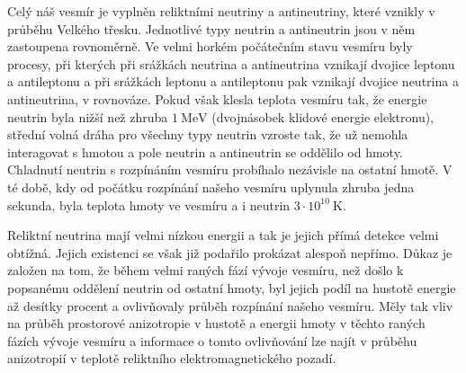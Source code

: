 \documentclass[../../main.tex]{subfiles}
\begin{document}
Celý náš vesmír je vyplněn reliktními neutriny a antineutriny, které vznikly v průběhu Velkého třesku. Jednotlivé typy neutrin a antineutrin jsou v něm zastoupena rovnoměrně. Ve velmi horkém počátečním stavu vesmíru byly procesy, při kterých při srážkách neutrina a antineutrina vznikají dvojice leptonu a antileptonu a při srážkách leptonu a antileptonu pak vznikají dvojice neutrina a antineutrina, v rovnováze. Pokud však klesla teplota vesmíru tak, že energie neutrin byla nižší než zhruba $1 ~\mathrm{MeV}$ (dvojnásobek klidové energie elektronu), střední volná dráha pro všechny typy neutrin vzroste tak, že už nemohla interagovat s hmotou a pole neutrin a antineutrin se oddělilo od hmoty. Chladnutí neutrin s rozpínáním vesmíru probíhalo nezávisle na ostatní hmotě. V té době, kdy od počátku rozpínání našeho vesmíru uplynula zhruba jedna sekunda, byla teplota hmoty ve vesmíru a i neutrin $3 \cdotp 10^{10} ~\mathrm{K}$.

Reliktní neutrina mají velmi nízkou energii a tak je jejich přímá detekce velmi obtížná.
Jejich existenci se však již podařilo prokázat alespoň nepřímo. Důkaz je založen na tom, že během velmi raných fází vývoje vesmíru, než došlo k popsanému oddělení neutrin od ostatní hmoty, byl jejich podíl na hustotě energie až desítky procent a ovlivňovaly průběh rozpínání našeho vesmíru. Měly tak vliv na průběh prostorové anizotropie v hustotě a energii hmoty v těchto raných fázích vývoje vesmíru a informace o tomto ovlivňování lze najít v průběhu anizotropií v teplotě reliktního elektromagnetického pozadí.
\end{document}
